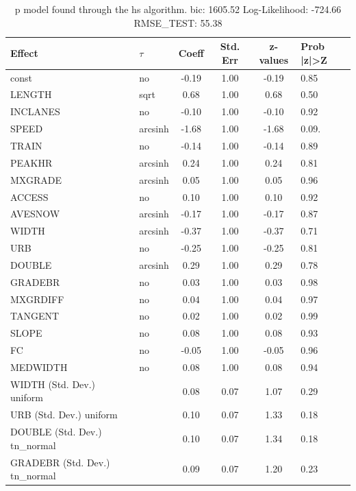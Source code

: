 \begin{table}
	\caption{p model found through the hs algorithm. bic: 1605.52 Log-Likelihood: -724.66 RMSE_TEST: 55.38}
	\begin{center}
		\begin{tabular}{|l|l|c|c|c|l|}
			\hline
			Effect & $\tau$ & Coeff & Std. Err & z-values & Prob |z|>Z \\
			\hline
			const & no & -0.19 & 1.00 & -0.19 & 0.85 \\
			\hline
			LENGTH & sqrt & 0.68 & 1.00 & 0.68 & 0.50 \\
			\hline
			INCLANES & no & -0.10 & 1.00 & -0.10 & 0.92 \\
			\hline
			SPEED & arcsinh & -1.68 & 1.00 & -1.68 & 0.09. \\
			\hline
			TRAIN & no & -0.14 & 1.00 & -0.14 & 0.89 \\
			\hline
			PEAKHR & arcsinh & 0.24 & 1.00 & 0.24 & 0.81 \\
			\hline
			MXGRADE & arcsinh & 0.05 & 1.00 & 0.05 & 0.96 \\
			\hline
			ACCESS & no & 0.10 & 1.00 & 0.10 & 0.92 \\
			\hline
			AVESNOW & arcsinh & -0.17 & 1.00 & -0.17 & 0.87 \\
			\hline
			WIDTH & arcsinh & -0.37 & 1.00 & -0.37 & 0.71 \\
			\hline
			URB & no & -0.25 & 1.00 & -0.25 & 0.81 \\
			\hline
			DOUBLE & arcsinh & 0.29 & 1.00 & 0.29 & 0.78 \\
			\hline
			GRADEBR & no & 0.03 & 1.00 & 0.03 & 0.98 \\
			\hline
			MXGRDIFF & no & 0.04 & 1.00 & 0.04 & 0.97 \\
			\hline
			TANGENT & no & 0.02 & 1.00 & 0.02 & 0.99 \\
			\hline
			SLOPE & no & 0.08 & 1.00 & 0.08 & 0.93 \\
			\hline
			FC & no & -0.05 & 1.00 & -0.05 & 0.96 \\
			\hline
			MEDWIDTH & no & 0.08 & 1.00 & 0.08 & 0.94 \\
			\hline
			WIDTH (Std. Dev.) uniform &  & 0.08 & 0.07 & 1.07 & 0.29 \\
			\hline
			URB (Std. Dev.) uniform &  & 0.10 & 0.07 & 1.33 & 0.18 \\
			\hline
			DOUBLE (Std. Dev.) tn_normal &  & 0.10 & 0.07 & 1.34 & 0.18 \\
			\hline
			GRADEBR (Std. Dev.) tn_normal &  & 0.09 & 0.07 & 1.20 & 0.23 \\

\end{tabular}
\end{center}
\end{table}
